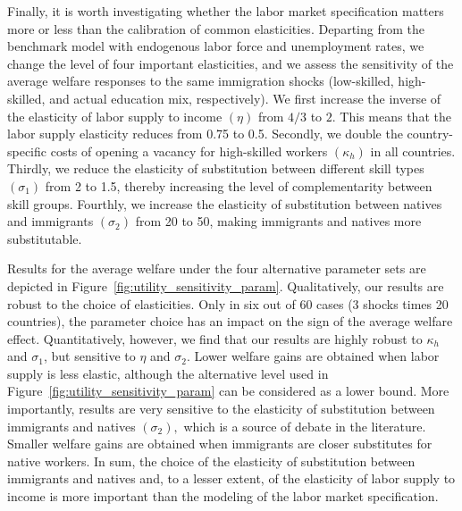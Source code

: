 \documentclass[a4paper,12pt]{article}
\begin{document}
Finally, it is worth investigating whether the labor market specification matters more or less than the calibration of common elasticities. Departing from the benchmark model with endogenous labor force and unemployment rates, we change the level of four important elasticities, and we assess the sensitivity of the average welfare responses to the same immigration shocks (low-skilled, high-skilled, and actual education mix, respectively). We first increase the inverse of the elasticity of labor supply to income $\left( \eta \right)$ from $4/3$ to $2$. This means that the labor supply elasticity reduces from 0.75 to 0.5. Secondly, we double the country-specific costs of opening a vacancy for high-skilled workers $\left( \kappa _{h}\right) $ in all countries. Thirdly, we reduce the elasticity of substitution between different skill types $\left( \sigma_{1}\right) $ from 2 to 1.5, thereby increasing the level of complementarity between skill groups. Fourthly, we increase the elasticity of substitution between natives and immigrants $\left( \sigma _{2}\right) $ from 20 to 50, making immigrants and natives more substitutable.

Results for the average welfare under the four alternative parameter sets are depicted in Figure~\ref{fig:utility_sensitivity_param}. Qualitatively, our results are robust to the choice of elasticities. Only in six out of 60 cases (3 shocks times 20 countries), the parameter choice has an impact on the sign of the average welfare effect. Quantitatively, however, we find that our results are highly robust to $\kappa _{h}$ and $\sigma _{1}$, but sensitive to $\eta $ and $\sigma _{2}$. Lower welfare gains are obtained when labor supply is less elastic, although the alternative level used in Figure~\ref{fig:utility_sensitivity_param} can be considered as a lower bound. More importantly, results are very sensitive to the elasticity of substitution between immigrants and natives $\left( \sigma _{2}\right),$ which is a source of debate in the literature. Smaller welfare gains are obtained when immigrants are closer substitutes for native workers. In sum, the choice of the elasticity of substitution between immigrants and natives and, to a lesser extent, of the elasticity of labor supply to income is more important than the modeling of the labor market specification.
\end{document}
